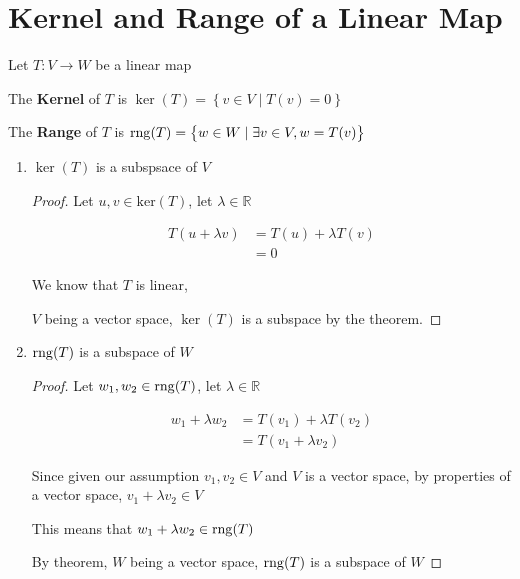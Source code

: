 \section{Kernel and Range of a Linear Map}

Let $T:V \to W$ be a linear map

\begin{definition}
	The \textbf{Kernel} of $T$ is $\ker(T) = \left\{v \in V \mid T(v) = 0\right\}$
\end{definition}

\begin{definition}
	The \textbf{Range} of $T$ is $\mathrm{rng}(T) = \left\{w \in W \mid \exists v \in V, w = T(v)\right\}$
\end{definition}

\begin{remark}
	\begin{enumerate}
		\item $\ker(T)$ is a subspsace of $V$
		
		\begin{proof}
			Let $u, v \in \mathrm{ker}(T)$, let $\lambda \in \mathbb{R}$

			\begin{align*}
				T(u + \lambda v) &= T(u) + \lambda T(v)\\
				&= 0
			\end{align*}

			We know that $T$ is linear,

			$V$ being a vector space, $\ker(T)$ is a subspace by the theorem.
		\end{proof}

		\item $\mathrm{rng}(T)$ is a subspace of $W$

		\begin{proof}
			Let $w_1, w_2 \in \mathrm{rng}(T)$, let $\lambda \in \mathbb{R}$

			\begin{align*}
				w_1 + \lambda w_2 &= T(v_1) + \lambda T(v_2)\\
				&= T(v_1 + \lambda v_2)
			\end{align*}

			Since given our assumption $v_1, v_2 \in V$ and $V$ is a vector space, by properties of a vector space, $v_1 + \lambda v_2 \in V$

			This means that $w_1 + \lambda w_2 \in \mathrm{rng}(T)$

			By theorem, $W$ being a vector space, $\mathrm{rng}(T)$ is a subspace of $W$
		\end{proof}


\end{enumerate}
\end{remark}
